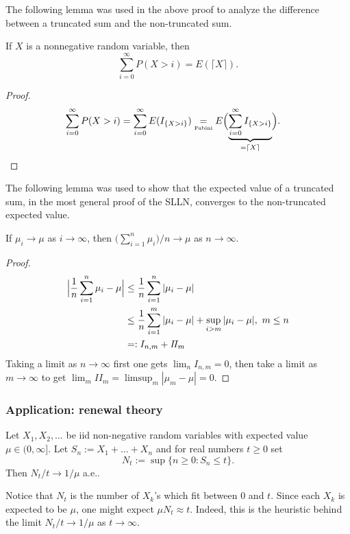 The following lemma was used in the above proof to analyze the difference between a truncated sum and the non-truncated sum. 

\begin{lemma}
\label{lemma: expect ceiling}
If $X$ is a nonnegative random variable, then 
\begin{equation}
\label{rtyu}
 \sum_{i=0}^\infty P(X>i) = E( \lceil X\rceil). 
 \end{equation}
\end{lemma}
\begin{proof}
\begin{align*}
\sum_{i=0}^\infty P(X>i)
& = \sum_{i=0}^\infty E(I_{\{X>i\}})  \underset{\text{\tiny Fubini}} =  E\Bigl(\underbrace{\sum_{i=0}^\infty I_{\{X>i\}}}_{=\lceil X\rceil}\Bigr).
\end{align*}
\end{proof}



The following lemma was used to show that the expected value of a truncated sum, in the most general proof of the SLLN, converges to the non-truncated expected value.
\begin{lemma}
\label{lemma: cesar summation}
If $\mu_i\rightarrow \mu$ as $i\rightarrow \infty$, then $\bigl(\sum_{i=1}^n \mu_i\bigr)/n\rightarrow \mu$ as $n\rightarrow \infty$.
\end{lemma}
\begin{proof}
\begin{align*}
\Bigl|\frac{1}{n}\sum_{i=1}^n \mu_i-  \mu\Bigr| 
& \leq \frac{1}{n}\sum_{i=1}^n |\mu_i - \mu|\\
& \leq \frac{1}{n}\sum_{i=1}^m |\mu_i - \mu| + \sup_{i > m} |\mu_i - \mu|,\,\, m\leq n\\
& =: I_{n,m} + I\!I_{m}
\end{align*}
Taking a limit as $n\rightarrow \infty$ first one gets $\lim_{n} I_{n,m} = 0$, then take a limit as $m\rightarrow \infty$ to get $\lim_{m} I\!I_{m} = \limsup_{m} |\mu_m - \mu| = 0$.
\end{proof}



\subsubsection{Application: renewal theory}

\begin{theorem}
Let $X_1, X_2, \ldots$ be iid non-negative random variables with expected value $\mu\in(0,\infty]$. Let $S_n:= X_1+\ldots+X_n$ and for real numbers $t\geq 0$ set
\[N_t:=\sup\{ n\geq 0\colon S_n\leq t \}.  \]
Then $N_t/t \rightarrow 1/\mu$ a.e..
\end{theorem}
Notice that $N_t$ is the number of $X_k$'s which fit between $0$ and $t$. Since each $X_k$ is expected to be $\mu$, one might expect $\mu N_t\approx t$. Indeed, this is the heuristic behind the limit $N_t/t \rightarrow 1/\mu$ as $t\rightarrow \infty$.

